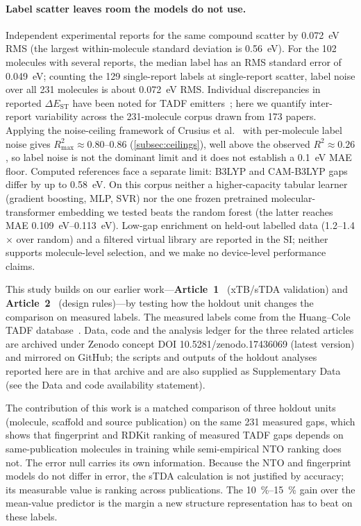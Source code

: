 \paragraph{Label scatter leaves room the models do not use.}
Independent experimental reports for the same compound scatter by
\qty{0.072}{\electronvolt} RMS (the largest within-molecule standard deviation is
\qty{0.56}{\electronvolt}). For the \num{102} molecules with several reports, the
median label has an RMS standard error of \qty{0.049}{\electronvolt}; counting the
\num{129} single-report labels at single-report scatter, label noise over all
\num{231} molecules is about \qty{0.072}{\electronvolt} RMS.
Individual discrepancies in reported $\Delta E_\text{ST}$ have been noted for
TADF emitters~\cite{Shuaib2026}; here we quantify inter-report variability
across the \num{231}-molecule corpus drawn from \num{173} papers.
Applying the noise-ceiling framework of Crusius et al.~\cite{Crusius2025} with
per-molecule label noise gives $R^2_\text{max} \approx 0.80$--\num{0.86}
(\cref{subsec:ceilings}), well above the observed $R^2 \approx 0.26$, so label
noise is not the dominant limit and it does not establish a
\qty{0.1}{\electronvolt} MAE floor. Computed references face a separate limit:
B3LYP and CAM-B3LYP gaps differ by up to \qty{0.58}{\electronvolt}. On this corpus
neither a higher-capacity tabular learner (gradient boosting, MLP, SVR) nor the one
frozen pretrained molecular-transformer embedding we tested beats the random forest
(the latter reaches MAE \qtyrange{0.109}{0.113}{\electronvolt}). Low-gap enrichment
on held-out labelled data (\numrange{1.2}{1.4}$\times$ over random) and a filtered
virtual library are reported in the SI; neither supports molecule-level selection,
and we make no device-level performance claims.

This study builds on our earlier work---\textbf{Article~1}~\cite{Tchapet2024_xTB}
(xTB/sTDA validation) and \textbf{Article~2}~\cite{Tchapet2024_DataDriven} (design
rules)---by testing how the holdout unit changes the comparison on measured labels.
The measured labels come from the Huang--Cole TADF database~\cite{HuangCole2024}.
Data, code and the analysis ledger for the three related articles are archived under
Zenodo concept DOI 10.5281/zenodo.17436069 (latest version) and mirrored on GitHub; the
scripts and outputs of the holdout analyses reported here are in that archive and are
also supplied as Supplementary Data (see the Data and code availability statement).

The contribution of this work is a matched comparison of three holdout units
(molecule, scaffold and source publication) on the same \num{231} measured gaps,
which shows that fingerprint and RDKit ranking of measured TADF gaps depends on
same-publication molecules in training while semi-empirical NTO ranking does not.
The error null carries its own information. Because the NTO and fingerprint models
do not differ in error, the sTDA calculation is not
justified by accuracy; its measurable value is ranking across publications. The
\qtyrange{10}{15}{\percent} gain over the mean-value predictor is the margin a new
structure representation has to beat on these labels.
